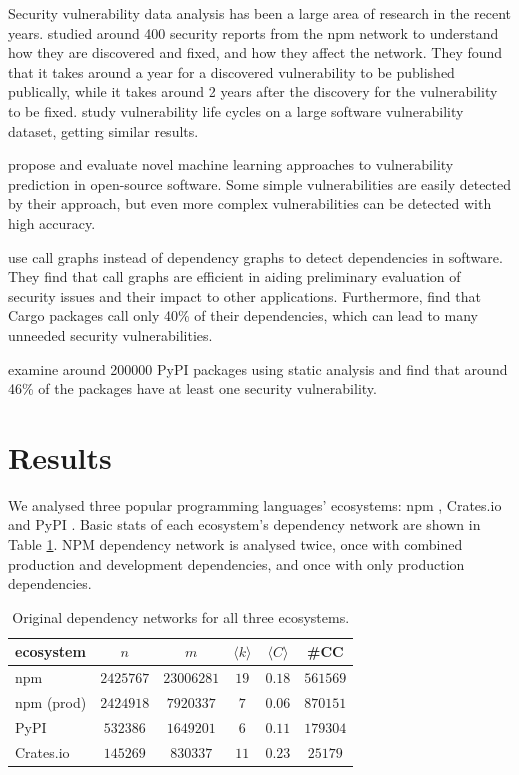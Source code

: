\documentclass[9pt,twocolumn,twoside]{pnas-report}
\begin{document}
Security vulnerability data analysis has been a large area of research in the recent years.
\cite{decan2018vulnerabilities} studied around 400 security reports from the npm network to understand how they are discovered and fixed, and how they affect the network.
They found that it takes around a year for a discovered vulnerability to be published publically, while it takes around 2 years after the discovery for the vulnerability to be fixed.
\cite{shahzad2012} study vulnerability life cycles on a large software vulnerability dataset, getting similar results.

\cite{HANIF2021103009} propose and evaluate novel machine learning approaches to vulnerability prediction in open-source software.
Some simple vulnerabilities are easily detected by their approach, but even more complex vulnerabilities can be detected with high accuracy.

\cite{hejderup2018} use call graphs instead of dependency graphs to detect dependencies in software.
They find that call graphs are efficient in aiding preliminary evaluation of security issues and their impact to other applications.
Furthermore, \cite{hejderup2022prazi} find that Cargo packages call only 40\% of their dependencies, which can lead to many unneeded security vulnerabilities.

\cite{ruohonen2021} examine around 200000 PyPI packages using static analysis and find that around 46\% of the packages have at least one security vulnerability.


\nocite{Kle00,Bou05,EB07,New08,For10,New12,FH16,PLC17,PDL18,Pei20}

\section*{Results}
We analysed three popular programming languages' ecosystems: npm \cite{NPM}, Crates.io \cite{crates} and PyPI \cite{pypi}.
Basic stats of each ecosystem's dependency network are shown in Table \ref{tab:basic_stats}.
NPM dependency network is analysed twice, once with combined production and development dependencies, and once with only production dependencies.

\begin{table}[h]\centering%
	\caption{Original dependency networks for all three ecosystems.}
	\begin{tabular}{l|ccccc}
		ecosystem  & $n$       & $m$        & $\langle k\rangle$ & $\langle C\rangle$ & \#CC     \\\hline
		npm        & $2425767$ & $23006281$ & $19$               & $0.18$             & $561569$ \\
		npm (prod) & $2424918$ & $7920337$  & $7$                & $0.06$             & $870151$ \\
		PyPI       & $532386$  & $1649201$  & $6$                & $0.11$             & $179304$ \\
		Crates.io  & $145269$  & $830337$   & $11$               & $0.23$             & $25179$  \\
	\end{tabular}
	\label{tab:basic_stats}
\end{table}
\end{document}
